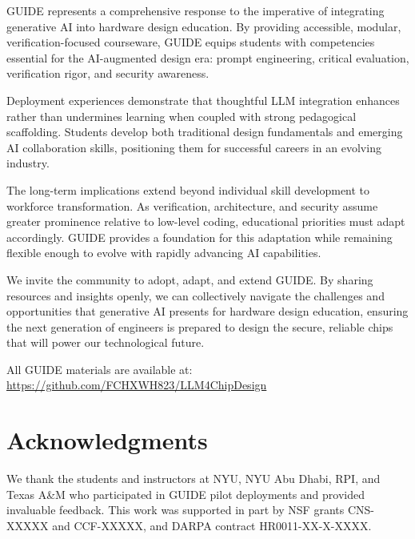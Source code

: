 \documentclass[10pt,conference]{IEEEtran}
\begin{document}
GUIDE represents a comprehensive response to the imperative of integrating generative AI into hardware design education. By providing accessible, modular, verification-focused courseware, GUIDE equips students with competencies essential for the AI-augmented design era: prompt engineering, critical evaluation, verification rigor, and security awareness.

Deployment experiences demonstrate that thoughtful LLM integration enhances rather than undermines learning when coupled with strong pedagogical scaffolding. Students develop both traditional design fundamentals and emerging AI collaboration skills, positioning them for successful careers in an evolving industry.

The long-term implications extend beyond individual skill development to workforce transformation. As verification, architecture, and security assume greater prominence relative to low-level coding, educational priorities must adapt accordingly. GUIDE provides a foundation for this adaptation while remaining flexible enough to evolve with rapidly advancing AI capabilities.

We invite the community to adopt, adapt, and extend GUIDE. By sharing resources and insights openly, we can collectively navigate the challenges and opportunities that generative AI presents for hardware design education, ensuring the next generation of engineers is prepared to design the secure, reliable chips that will power our technological future.

All GUIDE materials are available at: \url{https://github.com/FCHXWH823/LLM4ChipDesign}

\section*{Acknowledgments}

We thank the students and instructors at NYU, NYU Abu Dhabi, RPI, and Texas A\&M who participated in GUIDE pilot deployments and provided invaluable feedback. This work was supported in part by NSF grants CNS-XXXXX and CCF-XXXXX, and DARPA contract HR0011-XX-X-XXXX.



\end{document}
